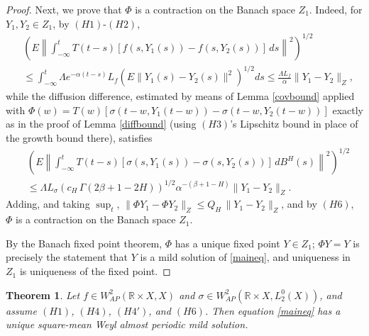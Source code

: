 \documentclass[11pt]{amsart}
\newtheorem{theorem}{Theorem}[section]
\begin{document}
\begin{proof}
Next, we prove that $\Phi$ is a contraction on the Banach space $Z_1$. Indeed, for $Y_1,Y_2\in Z_1$, by $(H1)$-$(H2)$,
\begin{align*}
&\left(E\left\|\int_{-\infty}^t T(t-s)[f(s,Y_1(s))-f(s,Y_2(s))]\,ds\right\|^2\right)^{1/2}\\
&\leq\int_{-\infty}^t\Lambda e^{-\alpha(t-s)}L_f\left(E\|Y_1(s)-Y_2(s)\|^2\right)^{1/2}ds\le\frac{\Lambda L_f}{\alpha}\|Y_1-Y_2\|_Z,
\end{align*}
while the diffusion difference, estimated by means of Lemma \ref{covbound} applied with $\Phi(w)=T(w)[\sigma(t-w,Y_1(t-w))-\sigma(t-w,Y_2(t-w))]$ exactly as in the proof of Lemma \ref{diffbound} (using $(H3)$'s Lipschitz bound in place of the growth bound there), satisfies
\begin{align*}
&\left(E\left\|\int_{-\infty}^t T(t-s)[\sigma(s,Y_1(s))-\sigma(s,Y_2(s))]\,dB^H(s)\right\|^2\right)^{1/2}\\
&\leq\Lambda L_\sigma\left(c_H\,\Gamma(2\beta+1-2H)\right)^{1/2}\alpha^{-(\beta+1-H)}\|Y_1-Y_2\|_Z.
\end{align*}
Adding, and taking $\sup_t$, $\|\Phi Y_1-\Phi Y_2\|_Z\leq Q_H\,\|Y_1-Y_2\|_Z$, and by $(H6)$, $\Phi$ is a contraction on the Banach space $Z_1$.

By the Banach fixed point theorem, $\Phi$ has a unique fixed point $Y\in Z_1$; $\Phi Y=Y$ is precisely the statement that $Y$ is a mild solution of \eqref{maineq}, and uniqueness in $Z_1$ is uniqueness of the fixed point.
\end{proof}

\begin{theorem}\label{ex2}
Let $f\in W^2_{AP}(\mathbb R\times X,X)$ and $\sigma\in W^2_{AP}(\mathbb R\times X,L^0_2(X))$, and assume $(H1)$, $(H4)$, $(H4')$, and $(H6)$. Then equation \eqref{maineq} has a unique square-mean Weyl almost periodic mild solution.
\end{theorem}
\end{document}
